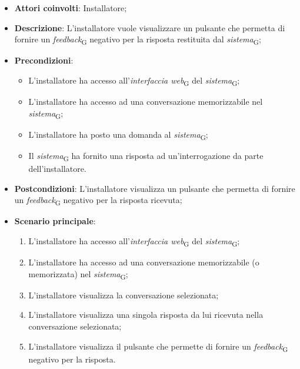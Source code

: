 \begin{itemize}
    \item \textbf{Attori coinvolti}: Installatore;
    \item \textbf{Descrizione}: L'installatore vuole visualizzare un pulsante che permetta di fornire un \textit{feedback}\textsubscript{G} negativo per la risposta restituita dal \textit{sistema}\textsubscript{G};
    \item \textbf{Precondizioni}: 
    \begin{itemize}
        \item L’installatore ha accesso all’\textit{interfaccia web}\textsubscript{G} del \textit{sistema}\textsubscript{G};
        \item L’installatore ha accesso ad una conversazione memorizzabile nel \textit{sistema}\textsubscript{G};
        \item L'installatore ha posto una domanda al \textit{sistema}\textsubscript{G};
        \item Il \textit{sistema}\textsubscript{G} ha fornito una risposta ad un’interrogazione da parte dell’installatore.
    \end{itemize}
    \item \textbf{Postcondizioni}: L'installatore visualizza un pulsante che permetta di fornire un \textit{feedback}\textsubscript{G} negativo per la risposta ricevuta;
    \item \textbf{Scenario principale}:
    \begin{enumerate}
        \item L’installatore ha accesso all’\textit{interfaccia web}\textsubscript{G} del \textit{sistema}\textsubscript{G};
        \item L’installatore ha accesso ad una conversazione memorizzabile (o memorizzata) nel \textit{sistema}\textsubscript{G};
        \item L'installatore visualizza la conversazione selezionata;
        \item L'installatore visualizza una singola risposta da lui ricevuta nella conversazione selezionata;
        \item L'installatore visualizza il pulsante che permette di fornire un \textit{feedback}\textsubscript{G} negativo per la risposta.
    \end{enumerate}
\end{itemize}

